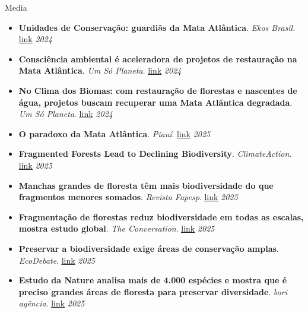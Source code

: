 \documentclass{resume}
\begin{document}
\begin{rSection}{Media}
\begin{itemize}
\item {\bf Unidades de Conservação: guardiãs da Mata Atlântica}. {\it Ekos Brasil}. \href{https://www.ekosbrasil.org/unidades-de-conservacao-guardias-da-mata-atlantica}{\underline{link}} \hfill{\em 2024}
\item {\bf Consciência ambiental é aceleradora de projetos de restauração na Mata Atlântica}. {\it Um Só Planeta}. \href{https://umsoplaneta.globo.com/clima/noticia/2024/09/26/consciencia-ambiental-e-aceleradora-de-projetos-de-restauracao-na-mata-atlantica.ghtml}{\underline{link}} \hfill{\em 2024}
\item {\bf No Clima dos Biomas: com restauração de florestas e nascentes de água, projetos buscam recuperar uma Mata Atlântica degradada}. {\it Um Só Planeta}. \href{https://umsoplaneta.globo.com/clima/noticia/2024/09/26/no-clima-dos-biomas-com-restauracao-de-florestas-e-nascentes-de-agua-projetos-buscam-recuperar-uma-mata-atlantica-degradada.ghtml}{\underline{link}} \hfill{\em 2024}
\item {\bf O paradoxo da Mata Atlântica}. {\it Piauí}. \href{https://piaui.folha.uol.com.br/paradoxo-mata-atlantica-crescimento/}{\underline{link}} \hfill{\em 2025}
\item {\bf Fragmented Forests Lead to Declining Biodiversity}. {\it ClimateAction}. \href{https://www.climateaction.org/news/fragmented-forests-lead-to-declining-biodiversity}{\underline{link}} \hfill{\em 2025}
\item {\bf Manchas grandes de floresta têm mais biodiversidade do que fragmentos menores somados}. {\it Revista Fapesp}. \href{https://revistapesquisa.fapesp.br/manchas-grandes-de-floresta-tem-mais-biodiversidade-do-que-fragmentos-menores-somados}{\underline{link}} \hfill{\em 2025}
\item {\bf Fragmentação de florestas reduz biodiversidade em todas as escalas, mostra estudo global}. {\it The Conversation}. \href{https://theconversation.com/fragmentacao-de-florestas-reduz-biodiversidade-em-todas-as-escalas-mostra-estudo-global-252096}{\underline{link}} \hfill{\em 2025}
\item {\bf Preservar a biodiversidade exige áreas de conservação amplas}. {\it EcoDebate}. \href{https://www.ecodebate.com.br/2025/03/13/preservar-a-biodiversidade-exige-areas-de-conservacao-amplas}{\underline{link}} \hfill{\em 2025}
\item {\bf Estudo da Nature analisa mais de 4.000 espécies e mostra que é preciso grandes áreas de floresta para preservar diversidade}. {\it bori agência}. \href{https://abori.com.br/ambiente/nature-biodiversidade-um/}{\underline{link}} \hfill{\em 2025}

\end{itemize}
\end{rSection}
\end{document}
